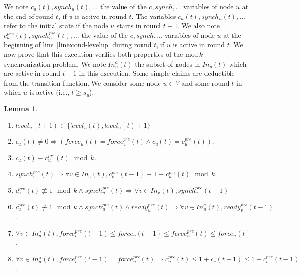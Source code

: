 \documentclass[11pt,letterpaper]{article}
\newtheorem{lem}[thm]{Lemma}
\begin{document}
We note $c_u(t), synch_u(t), \dots$ the value of the $c, synch, \dots$ variables of node $u$ at the end of round $t$, if $u$ is active in round $t$.
The variables $c_u(t), synch_u(t), \dots$ refer to the initial state if the node $u$ starts in round $t+1$.
We also note $c^{pre}_u(t), synch^{pre}_u(t), \dots$ the value of the $c, synch, \dots$ variables
of node $u$ at the beginning of line~\ref{line:cond-levelup} during round $t$, if $u$ is active in round $t$.
We now prove that this execution verifies both properties of the $\mathrm{mod}\,k$-synchronization problem.
We note $In_u^a(t)$ the subset of nodes in $In_u(t)$ which are active in round $t-1$ in this execution.
Some simple claims are deductible from the transition function.
We consider some node $u \in V$ and some round $t$ in which $u$ is active (i.e., $t \geq s_u$).
\begin{lem} \hfill
	\begin{enumerate}[label=\upshape(\alph*),ref=\thethm (\alph*)]
		\item\label{lem:cl1} $level_u(t+1) \in \{level_u(t), level_u(t)+1\}$
		\item\label{lem:cl2b}$c_u(t) \neq 0 \Rightarrow (force_u(t) = force_u^{pre}(t) \wedge c_u(t) = c_u^{pre}(t))$.
		\item\label{lem:cl2} $c_u(t) \equiv c_u^{pre}(t) \mod k$.
		\item\label{lem:cl3} $synch_u^{pre}(t) \Rightarrow \forall v \in In_u(t), c_v^{pre}(t-1) + 1 \equiv c_u^{pre}(t) \mod k$.
		\item\label{lem:cl4} $c_u^{pre}(t) \not\equiv 1 \mod k \wedge synch_u^{pre}(t) \Rightarrow \forall v \in In_u(t), synch_v^{pre}(t-1)$.
		\item\label{lem:cl5} $c_u^{pre}(t) \not\equiv 1 \mod k \wedge synch_u^{pre}(t) \wedge ready_u^{pre}(t) \Rightarrow \forall v \in In_u^a(t), ready_v^{pre}(t-1)$.
		\item\label{lem:cl6} $\forall v \in In_u^a(t), force_v^{pre}(t-1) \leq force_v(t-1) \leq force_u^{pre}(t) \leq force_u(t)$.
		\item\label{lem:cl7} $\forall v \in In_u^a(t), force_v^{pre}(t-1) = force_u^{pre}(t) \Rightarrow c_u^{pre}(t) \leq 1+c_v(t-1) \leq 1+c_v^{pre}(t-1)$.
	\end{enumerate}
\end{lem}
\end{document}

